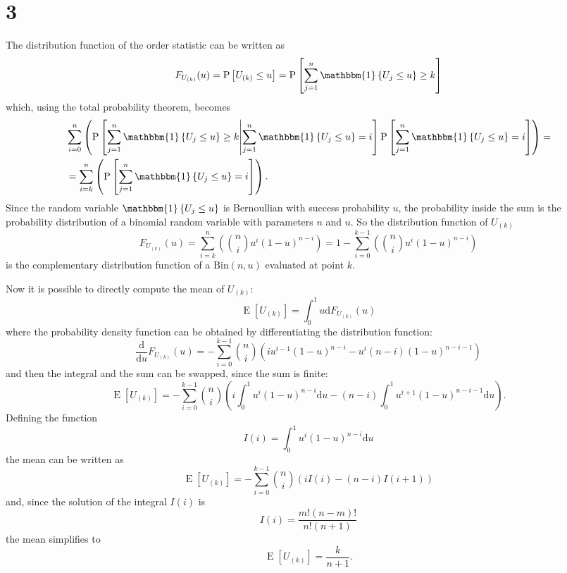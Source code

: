 \documentclass{article}
\newcommand{\E}[1]{\operatorname{E}\left[#1\right]}
\newcommand{\Prob}[1]{\operatorname{P}\left[#1\right]}
\newcommand{\ProbC}[2]{\operatorname{P}\left[#1\middle|#2\right]}
\newcommand{\ind}[1]{\operatorname{\mathbbm{1}}\left\{#1\right\}}
\begin{document}
\section*{3}
The distribution function of the order statistic can be written as
\[ F_{U_{(k)}}(u) = \Prob{U_{(k)} \leq u} = \Prob{\sum_{j=1}^n\ind{U_j \leq u} \geq k} \]
which, using the total probability theorem, becomes
\begin{align*}
  & \sum_{i=0}^n\left(\ProbC{\sum_{j=1}^n\ind{U_j \leq u} \geq k}{\sum_{j=1}^n\ind{U_j \leq u} = i}\Prob{\sum_{j=1}^n\ind{U_j \leq u} = i}\right) = \\
  &= \sum_{i=k}^n\left( \Prob{\sum_{j=1}^n\ind{U_j \leq u} = i} \right) . 
\end{align*}
Since the random variable $\ind{U_j \leq u}$ is Bernoullian with
success probability $u$, the probability inside the sum is the
probability distribution of a binomial random variable with parameters
$n$ and $u$. So the distribution function of $U_{(k)}$
\[  F_{U_{(k)}}(u) = \sum_{i=k}^n\left(\binom{n}{i}u^i(1-u)^{n-i}\right)
= 1 - \sum_{i=0}^{k-1}\left(\binom{n}{i}u^i(1-u)^{n-i}\right) \]
is the complementary distribution function of a
$\mathrm{Bin}(n,u)$ evaluated at point $k$.

Now it is possible to directly compute the mean of $U_{(k)}$:
\[ \E{U_{(k)}} = \int_0^1 u \mathrm{d} F_{U_{(k)}}(u) \]
where the probability density function can be obtained by
differentiating the distribution function:
\[ \frac{\mathrm{d}}{\mathrm{d}u} F_{U_{(k)}}(u) =
- \sum_{i=0}^{k-1}\binom{n}{i}\left( iu^{i-1}(1-u)^{n-i} - u^i(n-i)(1-u)^{n-i-1} \right) \]
and then the integral and the sum can be swapped, since the sum is finite:
\[ \E{U_{(k)}} = -\sum_{i=0}^{k-1}\binom{n}{i}\left( i\int_0^1u^i(1-u)^{n-i}\mathrm{d}u - (n-i)\int_0^1u^{i+1}(1-u)^{n-i-1}\mathrm{d}u \right) . \]
Defining the function
\[ I(i) = \int_0^1u^i(1-u)^{n-i} \mathrm{d}u \]
the mean can be written as
\[ \E{U_{(k)}} = -\sum_{i=0}^{k-1}\binom{n}{i}\left( iI(i) - (n-i)I(i+1) \right) \]
and, since the solution of the integral $I(i)$ is
\[ I(i) = \frac{m!(n-m)!}{n!(n+1)} \]
the mean simplifies to
\[ \E{U_{(k)}} = \frac{k}{n+1} . \]
\end{document}
